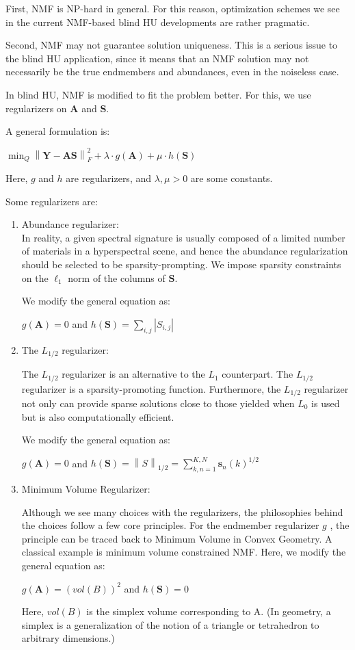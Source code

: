 \documentclass[fleqn, 11pt]{article}
\newcommand{\bs}[1]{\boldsymbol{#1}}
\newcommand\norm[1]{\left\lVert#1\right\rVert}
\begin{document}
First, NMF is NP-hard in general. 
For this reason, optimization schemes we see 
in the current NMF-based blind HU
developments are rather pragmatic.

Second, NMF may not guarantee solution uniqueness.
This is a serious issue to the blind 
HU application, 
since it means that an NMF solution may not necessarily 
be the true endmembers and abundances, 
even in the noiseless case.

In blind HU, NMF is modified to fit 
the problem better. For this, we use regularizers 
on $\bs{A}$ and $\bs{S}$.

\medskip

A general formulation is: 
\begin{center}
    $\displaystyle \min_{Q} \norm{\bs{Y-AS}}^2_F
    + \lambda \cdot g(\bs{A}) 
    + \mu \cdot h(\bs{S})$
\end{center}

Here, $g$ and $h$
are regularizers, and
$ \lambda , \mu > 0 $  are some constants.

Some regularizers are: 

\begin{enumerate}
    \item Abundance regularizer: \\ In reality, a given
spectral signature is usually composed of a limited number of
materials in a hyperspectral scene, and hence the abundance
regularization should be selected to be sparsity-prompting. We impose sparsity constraints on the $\ell_1$ norm of the columns of $\bs{S}$. 

We modify the general equation as: 

$g(\bs{A})=0$ and 
$h(\bs{S}) = \displaystyle \sum_{i,j} | S_{i,j} | $

\item The $L_{1/2}$ regularizer: 

 The $L_{1/2}$ regularizer is an
alternative to the $L_{1}$ counterpart. The $L_{1/2}$
regularizer is a sparsity-promoting function. Furthermore,
the $L_{1/2}$ regularizer not only can provide sparse solutions close
to those yielded when $L_{0}$ is used but is also computationally
efficient.

We modify the general equation as: 

$g(\bs{A})=0$ and 
$h(\bs{S}) = \norm{S}_{1/2} = 
\displaystyle \sum_{k,n=1}^{K,N} \bs{s}_n(k)^{1/2}
$

\item Minimum Volume Regularizer: 

Although we see many choices with the regularizers, the philosophies 
behind the choices follow a few core principles. For the endmember regularizer $g$ , the principle can be
traced back to Minimum Volume in Convex Geometry. A classical example is minimum
volume constrained NMF. Here, we modify the general equation as: 


$g(\bs{A})= (vol(B))^2
$ and 
$h(\bs{S}) = 0$

Here, $vol(B)$ is the simplex volume corresponding to A. (In geometry, a simplex is a generalization of the notion of a triangle or tetrahedron to arbitrary dimensions.)


\end{enumerate}
\end{document}
